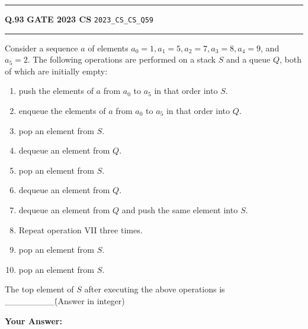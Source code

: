 \documentclass[a4paper,10pt]{article}
\begin{document}
\vspace{6pt}\hrule height 0.35pt\vspace{6pt}
\noindent
\begin{tcolorbox}[
    blanker,
    sidebyside,
    sidebyside align=top,
    lefthand width=0.55\textwidth,
    top=4pt, bottom=4pt, left=0pt, right=0pt,
    middle=16pt,
    underlay={
        \draw[dashed, black!80, line width=0.8pt, dash pattern=on 4pt off 3pt]
            ([xshift=0.55\textwidth+8pt]frame.north west) --
            ([xshift=0.55\textwidth+8pt]frame.south west);
    }
]
\textbf{Q.93}  \hfill {\footnotesize\textbf{GATE 2023 CS} \quad \tiny\texttt{2023\_CS\_CS\_Q59}}
\vspace{2pt}\hrule height 0.3pt\vspace{4pt}

Consider a sequence $a$ of elements $a_0 = 1, a_1 = 5, a_2 = 7, a_3 = 8, a_4 = 9$, and $a_5 = 2$. The following operations are performed on a stack $S$ and a queue $Q$, both of which are initially empty:
\begin{enumerate}[label=\Roman*.,itemsep=0pt,topsep=2pt]
\item push the elements of $a$ from $a_0$ to $a_5$ in that order into $S$.
\item enqueue the elements of $a$ from $a_0$ to $a_5$ in that order into $Q$.
\item pop an element from $S$.
\item dequeue an element from $Q$.
\item pop an element from $S$.
\item dequeue an element from $Q$.
\item dequeue an element from $Q$ and push the same element into $S$.
\item Repeat operation VII three times.
\item pop an element from $S$.
\item pop an element from $S$.
\end{enumerate}
The top element of $S$ after executing the above operations is \_\_\_\_\_\_\_\_\. (Answer in integer)

\par\vspace{6pt}\noindent\textbf{Your Answer:} \fbox{\rule{0pt}{1.3ex}\hspace{3cm}}

\tcblower


\end{tcolorbox}
\end{document}
